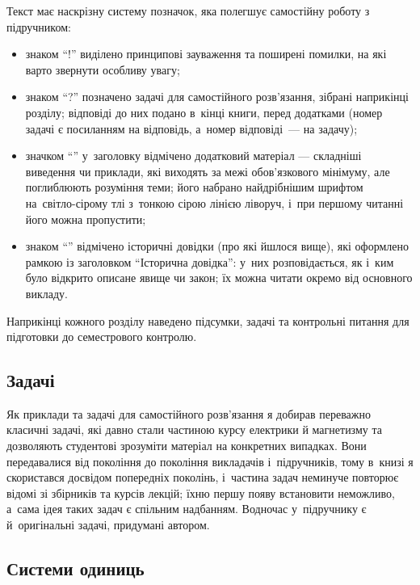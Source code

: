 Текст має наскрізну систему позначок, яка полегшує самостійну роботу з підручником:
\begin{itemize}
    \item знаком \enquote{!} виділено принципові зауваження та поширені помилки, на які
      варто звернути особливу увагу;
    \item знаком \enquote{?} позначено задачі для самостійного розв'язання, зібрані
      наприкінці розділу; відповіді до них подано в~кінці книги, перед додатками (номер
      задачі є посиланням на відповідь, а~номер відповіді~--- на задачу);
    \item значком \enquote{\faMicroscope} у~заголовку відмічено додатковий матеріал --- складніші виведення чи
      приклади, які виходять за межі обов'язкового мінімуму, але поглиблюють розуміння
      теми; його набрано найдрібнішим шрифтом на~світло-сірому тлі з~тонкою сірою лінією
      ліворуч, і~при першому читанні його можна пропустити;
    \item знаком \enquote{\faHistory} відмічено історичні довідки (про які йшлося вище),
      які оформлено рамкою із заголовком \enquote{Історична довідка}: у~них
      розповідається, як і~ким було відкрито описане явище чи закон; їх можна читати
      окремо від основного викладу.
\end{itemize}
Наприкінці кожного розділу наведено підсумки, задачі та контрольні питання для підготовки
до семестрового контролю.

\subsection*{Задачі}

Як приклади та задачі для самостійного розв'язання я добирав переважно
класичні задачі, які давно стали частиною курсу електрики й магнетизму та дозволяють
студентові зрозуміти матеріал на конкретних випадках. Вони передавалися від
покоління до покоління викладачів і~підручників, тому в~книзі я скористався досвідом
попередніх поколінь, і~частина задач неминуче повторює відомі зі збірників та курсів
лекцій; їхню першу появу встановити неможливо, а~сама ідея таких задач є спільним
надбанням. Водночас у~підручнику є й~оригінальні задачі, придумані автором.

\subsection*{Системи одиниць}

